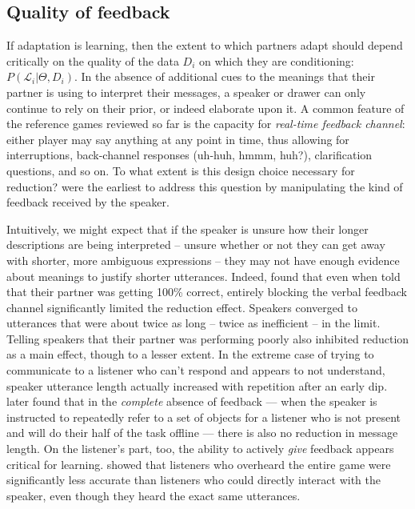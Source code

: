 \subsection{Quality of feedback}

If adaptation is learning, then the extent to which partners adapt should depend critically on the quality of the data $D_i$ on which they are conditioning: $P(\mathcal{L}_i | \Theta, D_i)$. In the absence of additional cues to the meanings that their partner is using to interpret their messages, a speaker or drawer can only continue to rely on their prior, or indeed elaborate upon it. A common feature of the reference games reviewed so far is the capacity for \emph{real-time feedback channel}: either player may say anything at any point in time, thus allowing for interruptions, back-channel responses (uh-huh, hmmm, huh?), clarification questions, and so on. To what extent is this design choice necessary for reduction?  were the earliest to address this question by manipulating the kind of feedback received by the speaker.


Intuitively, we might expect that if the speaker is unsure how their longer descriptions are being interpreted -- unsure whether or not they can get away with shorter, more ambiguous expressions -- they may not have enough evidence about meanings to justify shorter utterances. Indeed,  found that even when told that their partner was getting 100\% correct, entirely blocking the verbal feedback channel significantly limited the reduction effect. Speakers converged to utterances that were about twice as long -- twice as inefficient -- in the limit. Telling speakers that their partner was performing poorly also inhibited reduction as a main effect, though to a lesser extent. In the extreme case of trying to communicate to a listener who can't respond and appears to not understand, speaker utterance length actually increased with repetition after an early dip.  later found that in the \emph{complete} absence of feedback --- when the speaker is instructed to repeatedly refer to a set of objects for a listener who is not present and will do their half of the task offline --- there is also no reduction in message length. On the listener's part, too, the ability to actively \emph{give} feedback appears critical for learning.  showed that listeners who overheard the entire game were significantly less accurate than listeners who could directly interact with the speaker, even though they heard the exact same utterances.


